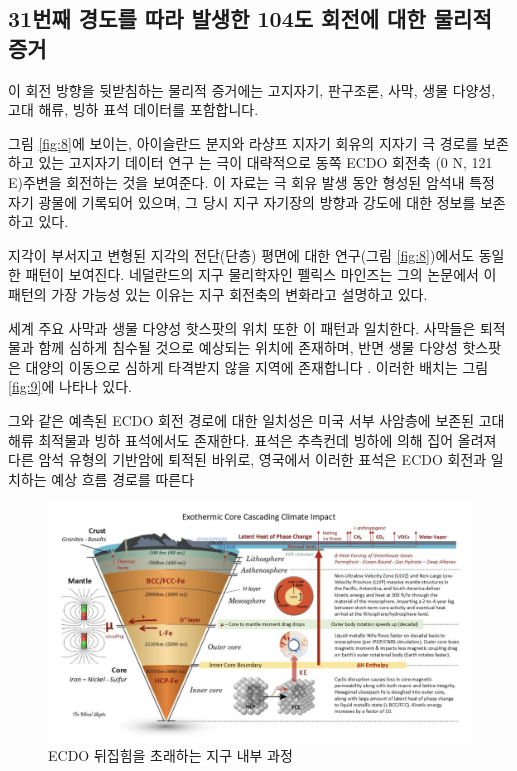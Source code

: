 \documentclass[10pt,twocolumn,letterpaper]{article}
\begin{document}
\subsection{31번째 경도를 따라 발생한 104도 회전에 대한 물리적 증거}


이 회전 방향을 뒷받침하는 물리적 증거에는 고지자기, 판구조론, 사막, 생물 다양성, 고대 해류, 빙하 표석 데이터를 포함합니다.

그림 \ref{fig:8}에 보이는, 아이슬란드 분지와 라샹프 지자기 회유의 지자기 극 경로를 보존하고 있는 고지자기 데이터 연구 \cite{35}는 극이 대략적으로 동쪽 ECDO 회전축 (0 N, 121 E)주변을 회전하는 것을 보여준다. 이 자료는 극 회유 발생 동안 형성된 암석내 특정 자기 광물에 기록되어 있으며, 그 당시 지구 자기장의 방향과 강도에 대한 정보를 보존하고 있다.

지각이 부서지고 변형된 지각의 전단(단층) 평면에 대한 연구(그림 \ref{fig:8})에서도  동일한 패턴이 보여진다. 네덜란드의 지구 물리학자인 펠릭스 마인즈는 그의 논문에서 \cite{36} 이 패턴의 가장 가능성 있는 이유는 지구 회전축의 변화라고 설명하고 있다.

세계 주요 사막과 생물 다양성 핫스팟의 위치 또한 이 패턴과 일치한다. 사막들은 퇴적물과 함께 심하게 침수될 것으로 예상되는 위치에 존재하며, 반면 생물 다양성 핫스팟은 대양의 이동으로 심하게 타격받지 않을 지역에 존재합니다 \cite{28}. 이러한 배치는 그림 \ref{fig:9}에 나타나 있다.

그와 같은 예측된 ECDO 회전 경로에 대한 일치성은  미국 서부 사암층에 보존된 고대 해류 최적물과 빙하 표석에서도 존재한다. 표석은 추측컨데 빙하에 의해 집어 올려져 다른 암석 유형의 기반암에 퇴적된 바위로,  영국에서 이러한 표석은  ECDO 회전과 일치하는 예상 흐름 경로를 따른다 \cite{67,68}

\begin{figure}[b]
\begin{center}
\includegraphics[width=1\textwidth]{layers.jpg}
\end{center}
   \caption{ECDO 뒤집힘을 초래하는 지구 내부 과정 \cite{129}}
\label{fig:11}
\end{figure}
\end{document}
